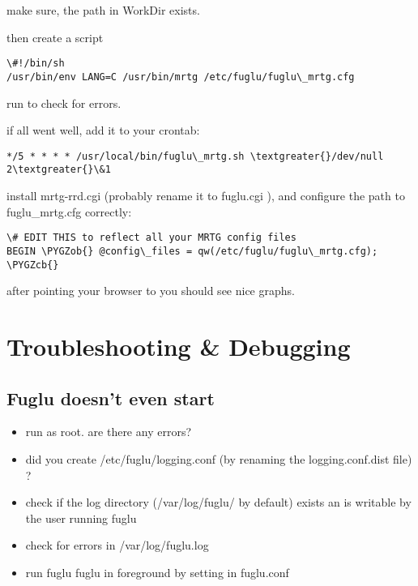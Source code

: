 \documentclass[letterpaper,10pt,english]{sphinxmanual}
\def\PYGZob{\char`\{}
\def\PYGZcb{\char`\}}
\begin{document}
make sure, the path in WorkDir exists.

then create a script 

\begin{Verbatim}[commandchars=\\\{\}]
\#!/bin/sh
/usr/bin/env LANG=C /usr/bin/mrtg /etc/fuglu/fuglu\_mrtg.cfg
\end{Verbatim}

run  to check for errors.

if all went well, add it to your crontab:

\begin{Verbatim}[commandchars=\\\{\}]
*/5 * * * * /usr/local/bin/fuglu\_mrtg.sh \textgreater{}/dev/null 2\textgreater{}\&1
\end{Verbatim}

install mrtg-rrd.cgi (probably rename it to fuglu.cgi ), and configure the path to fuglu\_mrtg.cfg correctly:

\begin{Verbatim}[commandchars=\\\{\}]
\# EDIT THIS to reflect all your MRTG config files
BEGIN \PYGZob{} @config\_files = qw(/etc/fuglu/fuglu\_mrtg.cfg); \PYGZcb{}
\end{Verbatim}

after pointing your browser to  you should see nice graphs.


\section{Troubleshooting \& Debugging}
\label{operation-index:troubleshooting-debugging}

\subsection{Fuglu doesn't even start}
\label{operation-index:fuglu-doesn-t-even-start}\begin{itemize}
\item {} 
run  as root. are there any errors?

\item {} 
did you create /etc/fuglu/logging.conf (by renaming the logging.conf.dist file) ?

\item {} 
check if the log directory (/var/log/fuglu/ by default) exists an is writable by the user running fuglu

\item {} 
check for errors in /var/log/fuglu.log

\item {} 
run fuglu fuglu in foreground by setting  in fuglu.conf

\end{itemize}
\end{document}
